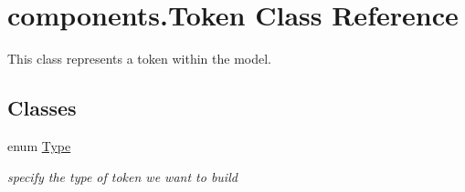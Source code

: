 \hypertarget{classcomponents_1_1_token}{}\section{components.\+Token Class Reference}
\label{classcomponents_1_1_token}


This class represents a token within the model.  


\subsection*{Classes}
\begin{DoxyCompactItemize}
\item 
enum \hyperlink{enumcomponents_1_1_token_1_1_type}{Type}
\begin{DoxyCompactList}\small\item\em specify the type of token we want to build \end{DoxyCompactList}\end{DoxyCompactItemize}
